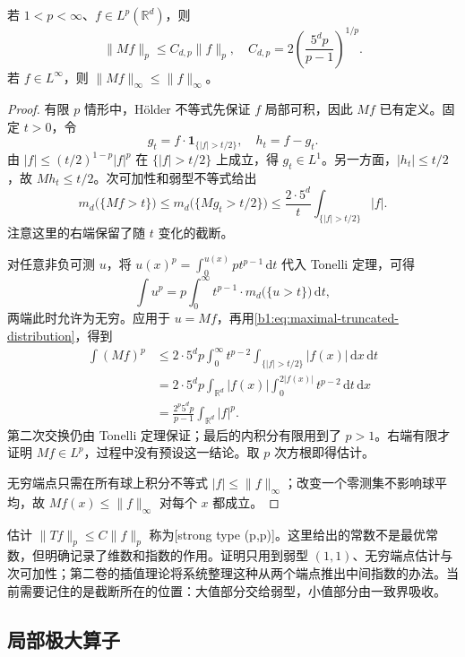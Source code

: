 \begin{theorem}\label{b1:thm:hl-strong-pp}
若 \(1<p<\infty\)、\(f\in L^p(\mathbb R^d)\)，则
\[
 \|Mf\|_p\leq C_{d,p}\|f\|_p,
 \quad C_{d,p}=2\left(\frac{5^dp}{p-1}\right)^{1/p}.
\]
若 \(f\in L^\infty\)，则 \(\|Mf\|_\infty\leq\|f\|_\infty\)。
\end{theorem}
\begin{proof}
有限 \(p\) 情形中，Hölder 不等式先保证 \(f\) 局部可积，因此 \(Mf\) 已有定义。固定 \(t>0\)，令
\[
 g_t=f\cdot\mathbf1_{\{|f|>t/2\}},\quad h_t=f-g_t.
\]
由 \(|f|\leq(t/2)^{1-p}|f|^p\) 在 \(\{|f|>t/2\}\) 上成立，得 \(g_t\in L^1\)。另一方面，\(|h_t|\leq t/2\)，故 \(Mh_t\leq t/2\)。次可加性和弱型不等式给出
\begin{equation}\label{b1:eq:maximal-truncated-distribution}
 m_d\bigl(\{Mf>t\}\bigr)
 \leq m_d\bigl(\{Mg_t>t/2\}\bigr)
 \leq\frac{2\cdot5^d}{t}\int_{\{|f|>t/2\}}|f|.
\end{equation}
注意这里的右端保留了随 \(t\) 变化的截断。

对任意非负可测 \(u\)，将 \(u(x)^p=\int_0^{u(x)}pt^{p-1}\,\mathrm dt\) 代入 Tonelli 定理，可得
\[
 \int u^p=p\int_0^\infty t^{p-1}\cdot m_d\bigl(\{u>t\}\bigr)\,\mathrm dt,
\]
两端此时允许为无穷。应用于 \(u=Mf\)，再用\eqref{b1:eq:maximal-truncated-distribution}，得到
\[
 \begin{aligned}
 \int(Mf)^p
 &\leq2\cdot5^dp\int_0^\infty t^{p-2}
              \int_{\{|f|>t/2\}}|f(x)|\,\mathrm dx\,\mathrm dt\\
 &=2\cdot5^dp\int_{\mathbb R^d}|f(x)|
                   \int_0^{2|f(x)|}t^{p-2}\,\mathrm dt\,\mathrm dx\\
 &=\frac{2^p5^dp}{p-1}\int_{\mathbb R^d}|f|^p.
 \end{aligned}
\]
第二次交换仍由 Tonelli 定理保证；最后的内积分有限用到了 \(p>1\)。右端有限才证明 \(Mf\in L^p\)，过程中没有预设这一结论。取 \(p\) 次方根即得估计。

无穷端点只需在所有球上积分不等式 \(|f|\leq\|f\|_\infty\)；改变一个零测集不影响球平均，故 \(Mf(x)\leq\|f\|_\infty\) 对每个 \(x\) 都成立。
\end{proof}

估计 \(\|Tf\|_p\leq C\|f\|_p\) 称为[strong type (p,p)]。这里给出的常数不是最优常数，但明确记录了维数和指数的作用。证明只用到弱型 \((1,1)\)、无穷端点估计与次可加性；第二卷的插值理论将系统整理这种从两个端点推出中间指数的办法。当前需要记住的是截断所在的位置：大值部分交给弱型，小值部分由一致界吸收。

\subsection{局部极大算子}
\label{b1:subsec:130304}

